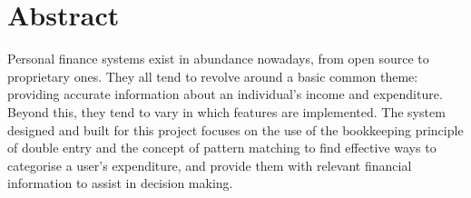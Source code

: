 \section*{Abstract} \label{sec:Abstract}
Personal finance systems exist in abundance nowadays, from open source to
proprietary ones. They all tend to revolve around a basic common theme:
providing accurate information about an individual's income and expenditure.
Beyond this, they tend to vary in which features are implemented. The system
designed and built for this project focuses on the use of the bookkeeping
principle of double entry and the concept of pattern matching to find effective
ways to categorise a user's expenditure, and provide them with relevant
financial information to assist in decision making.
